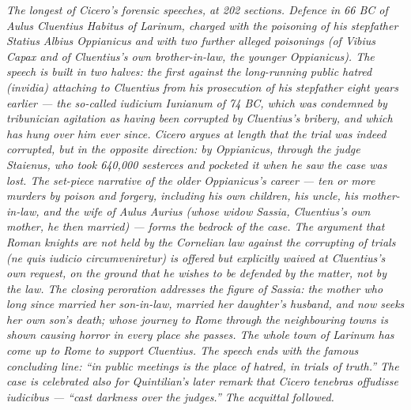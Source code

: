 
\textit{The longest of Cicero's forensic speeches, at 202
sections. Defence in 66 BC of Aulus Cluentius Habitus of Larinum,
charged with the poisoning of his stepfather Statius Albius
Oppianicus and with two further alleged poisonings (of Vibius
Capax and of Cluentius's own brother-in-law, the younger
Oppianicus). The speech is built in two halves: the first against
the long-running public hatred (\textit{invidia}) attaching to
Cluentius from his prosecution of his stepfather eight years
earlier --- the so-called \textit{iudicium Iunianum} of 74 BC,
which was condemned by tribunician agitation as having been
corrupted by Cluentius's bribery, and which has hung over him
ever since. Cicero argues at length that the trial was indeed
corrupted, but in the opposite direction: by Oppianicus, through
the judge Staienus, who took 640{,}000 sesterces and pocketed it
when he saw the case was lost. The set-piece narrative of the
older Oppianicus's career --- ten or more murders by poison and
forgery, including his own children, his uncle, his
mother-in-law, and the wife of Aulus Aurius (whose widow Sassia,
Cluentius's own mother, he then married) --- forms the bedrock of
the case. The argument that Roman knights are not held by the
Cornelian law against the corrupting of trials (\textit{ne quis
iudicio circumveniretur}) is offered but explicitly waived at
Cluentius's own request, on the ground that he wishes to be
defended by the matter, not by the law. The closing peroration
addresses the figure of Sassia: the mother who long since
married her son-in-law, married her daughter's husband, and now
seeks her own son's death; whose journey to Rome through the
neighbouring towns is shown causing horror in every place she
passes. The whole town of Larinum has come up to Rome to support
Cluentius. The speech ends with the famous concluding line: ``in
public meetings is the place of hatred, in trials of truth.'' The
case is celebrated also for Quintilian's later remark that Cicero
\textit{tenebras offudisse iudicibus} --- ``cast darkness over
the judges.'' The acquittal followed.}
